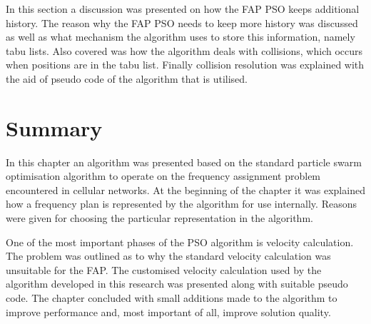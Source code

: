 In this section a discussion was presented on how the \gls{FAP} \gls{PSO} keeps additional history. The reason why the \gls{FAP} \gls{PSO} needs to keep more history was discussed as well as what mechanism the algorithm uses to store this information, namely tabu lists. Also covered was how the algorithm deals with collisions, which occurs when positions are in the tabu list. Finally collision resolution was explained with the aid of pseudo code of the algorithm that is utilised.

\section{Summary}
In this chapter an algorithm was presented based on the standard particle swarm optimisation algorithm to operate on the frequency assignment problem encountered in cellular networks. At the beginning of the chapter it was explained how a frequency plan is represented by the algorithm for use internally. Reasons were given for choosing the particular representation in the algorithm.

One of the most important phases of the \gls{PSO} algorithm is velocity calculation. The problem was outlined as to why the standard velocity calculation was unsuitable for the \gls{FAP}. The customised velocity calculation used by the algorithm developed in this research was presented along with suitable pseudo code. The chapter concluded with small additions made to the algorithm to improve performance and, most important of all, improve solution quality.
